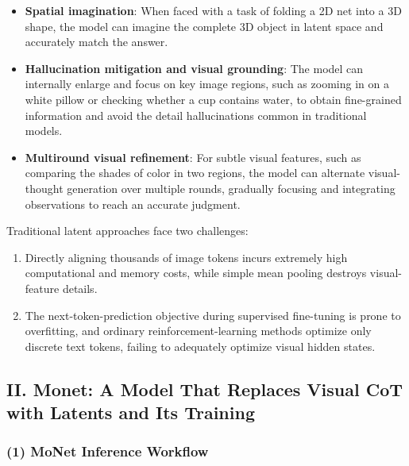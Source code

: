 \begin{itemize}
\tightlist
\item
  \textbf{Spatial imagination}: When faced with a task of folding a 2D net into a 3D shape, the model can imagine the complete 3D object in latent space and accurately match the answer.
\item
  \textbf{Hallucination mitigation and visual grounding}: The model can internally enlarge and focus on key image regions, such as zooming in on a white pillow or checking whether a cup contains water, to obtain fine-grained information and avoid the detail hallucinations common in traditional models.
\item
  \textbf{Multiround visual refinement}: For subtle visual features, such as comparing the shades of color in two regions, the model can alternate visual-thought generation over multiple rounds, gradually focusing and integrating observations to reach an accurate judgment.
\end{itemize}

Traditional latent approaches face two challenges:

\begin{enumerate}
\def\labelenumi{\arabic{enumi}.}
\tightlist
\item
  Directly aligning thousands of image tokens incurs extremely high computational and memory costs, while simple mean pooling destroys visual-feature details.
\item
  The next-token-prediction objective during supervised fine-tuning is prone to overfitting, and ordinary reinforcement-learning methods optimize only discrete text tokens, failing to adequately optimize visual hidden states.
\end{enumerate}

\hypertarget{ii.-monet-a-model-that-replaces-visual-cot-with-latents-and-its-training}{%
\subsection{II. Monet: A Model That Replaces Visual CoT with Latents and Its Training}\label{ii.-monet-a-model-that-replaces-visual-cot-with-latents-and-its-training}}

\hypertarget{monet-inference-workflow}{%
\subsubsection{(1) MoNet Inference Workflow}\label{monet-inference-workflow}}

